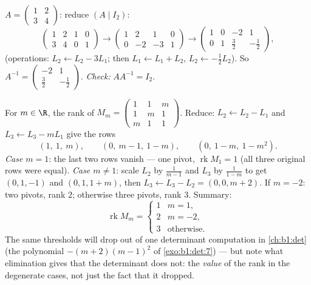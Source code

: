 \begin{example}\label{ex:b1:matrices:inverse}
$A = \begin{pmatrix} 1 & 2 \\ 3 & 4 \end{pmatrix}$: reduce $(A \mid
I_2)$:
\[
\begin{pmatrix} 1 & 2 & 1 & 0\\ 3 & 4 & 0 & 1 \end{pmatrix}
\to
\begin{pmatrix} 1 & 2 & 1 & 0\\ 0 & -2 & -3 & 1 \end{pmatrix}
\to
\begin{pmatrix} 1 & 0 & -2 & 1\\ 0 & 1 & \tfrac32 & -\tfrac12
\end{pmatrix},
\]
(operations: $L_2 \leftarrow L_2 - 3L_1$; then $L_1 \leftarrow L_1
+ L_2$, $L_2 \leftarrow -\frac12 L_2$). So $A^{-1} =
\begin{pmatrix} -2 & 1 \\ \tfrac32 & -\tfrac12\end{pmatrix}$.
\emph{Check:} $AA^{-1} = I_2$.
\end{example}

\begin{example}
\label{ex:b1:matrices:rankparameter}
For $m \in \R$, the rank of
$M_m = \begin{pmatrix} 1 & 1 & m\\ 1 & m & 1\\ m & 1 &
1\end{pmatrix}$. Reduce: $L_2 \leftarrow L_2 - L_1$ and $L_3
\leftarrow L_3 - mL_1$ give the rows
\[
(1,\ 1,\ m), \qquad (0,\ m - 1,\ 1 - m), \qquad
(0,\ 1 - m,\ 1 - m^2).
\]
\emph{Case $m = 1$}: the last two rows vanish --- one pivot,
$\operatorname{rk} M_1 = 1$ (all three original rows were
equal). \emph{Case $m \neq 1$}: scale $L_2$ by $\frac1{m-1}$ and
$L_3$ by $\frac1{1-m}$ to get $(0, 1, -1)$ and $(0, 1, 1 + m)$,
then $L_3 \leftarrow L_3 - L_2 = (0, 0, m + 2)$. If $m = -2$:
two pivots, rank $2$; otherwise three pivots, rank $3$. Summary:
\[
\operatorname{rk} M_m =
\begin{cases}
1 & m = 1,\\
2 & m = -2,\\
3 & \text{otherwise}.
\end{cases}
\]
The same thresholds will drop out of one determinant computation
in \cref{ch:b1:det} (the polynomial $-(m+2)(m-1)^2$ of
\cref{exo:b1:det:7}) --- but note what elimination gives that
the determinant does not: the \emph{value} of the rank in the
degenerate cases, not just the fact that it dropped.
\end{example}

